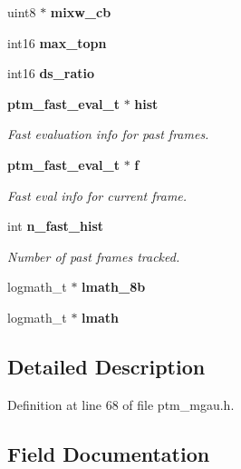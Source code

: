 \begin{DoxyCompactItemize}
\item 
uint8 $\ast$ {\bfseries mixw\-\_\-cb}\label{structptm__mgau__s_a5a3c76d47b94978f717a65fa0dfb54e8}

\item 
int16 {\bfseries max\-\_\-topn}\label{structptm__mgau__s_ab397cfdf51d309de4521edc09e80541d}

\item 
int16 {\bfseries ds\-\_\-ratio}\label{structptm__mgau__s_a2254b6ec79c97516b326ad33d22d0050}

\item 
{\bf ptm\-\_\-fast\-\_\-eval\-\_\-t} $\ast$ {\bf hist}
\begin{DoxyCompactList}\small\item\em Fast evaluation info for past frames. \end{DoxyCompactList}\item 
{\bf ptm\-\_\-fast\-\_\-eval\-\_\-t} $\ast$ {\bf f}
\begin{DoxyCompactList}\small\item\em Fast eval info for current frame. \end{DoxyCompactList}\item 
int {\bf n\-\_\-fast\-\_\-hist}
\begin{DoxyCompactList}\small\item\em Number of past frames tracked. \end{DoxyCompactList}\item 
logmath\-\_\-t $\ast$ {\bfseries lmath\-\_\-8b}\label{structptm__mgau__s_ad577181af2afca66f33f1f1e4c576ae8}

\item 
logmath\-\_\-t $\ast$ {\bfseries lmath}\label{structptm__mgau__s_abbaabfb8678356673a2c0a515e33a378}

\end{DoxyCompactItemize}


\subsection{Detailed Description}


Definition at line 68 of file ptm\-\_\-mgau.\-h.



\subsection{Field Documentation}
